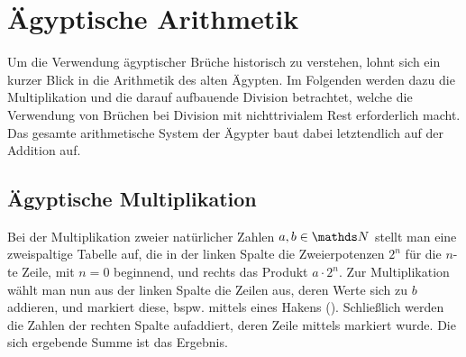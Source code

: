 \section{Ägyptische Arithmetik}
	Um die Verwendung ägyptischer Brüche historisch zu verstehen, lohnt sich ein kurzer Blick in die Arithmetik des alten Ägypten. Im Folgenden werden dazu die Multiplikation und die darauf aufbauende Division betrachtet, welche die Verwendung von Brüchen bei Division mit nichttrivialem Rest erforderlich macht. Das gesamte arithmetische System der Ägypter baut dabei letztendlich auf der Addition auf.

\subsection{Ägyptische Multiplikation}\label{subsec:egypMult}
	Bei der Multiplikation zweier natürlicher Zahlen $a, b \in \N$ stellt man eine zweispaltige Tabelle auf, die in der linken Spalte die Zweierpotenzen $2^{n}$ für die $n$-te Zeile, mit $n=0$ beginnend, und rechts das Produkt $a \cdot 2^n$.
	Zur Multiplikation wählt man nun aus der linken Spalte die Zeilen aus, deren Werte sich zu $b$ addieren, und markiert diese, bspw. mittels eines Hakens (\checkmark). Schließlich werden die Zahlen der rechten Spalte aufaddiert, deren Zeile mittels \checkmark markiert wurde. Die sich ergebende Summe ist das Ergebnis.
	
